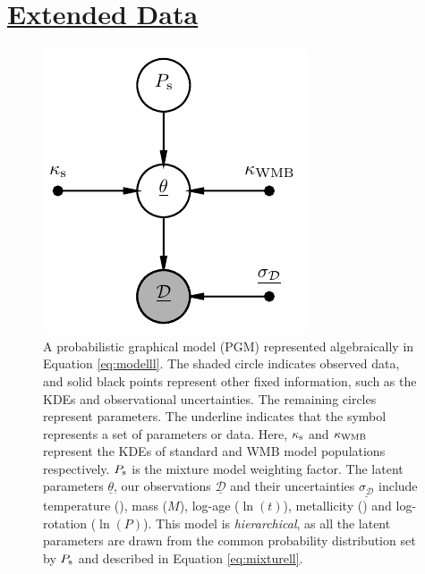 \clearpage 
\section*{\underline{Extended Data}}

\setcounter{figure}{0}    

\begin{figure}[h!]
	\centering
	\includegraphics[width=0.6 \textwidth]{pgm_models.pdf}
	\caption{A probabilistic graphical model (PGM) represented algebraically in Equation \ref{eq:modelll}. The shaded circle indicates observed data, and solid black points represent other fixed information, such as the KDEs and observational uncertainties. The remaining circles represent parameters. The underline indicates that the symbol represents a set of parameters or data. Here, $\kappa_{\rm{s}}$ and $\kappa_{\rm WMB}$ represent the KDEs of standard and WMB model populations respectively. $P_{\rm{s}}$ is the mixture model weighting factor. The latent parameters $\underline{\theta}$, our observations $\underline{\mathcal{D}}$ and their uncertainties $\underline{\sigma_{\mathcal{D}}}$ include temperature (\teff), mass ($M$), log-age ($\ln(t)$), metallicity (\feh) and log-rotation ($\ln(P)$). This model is \textit{hierarchical}, as all the latent parameters are drawn from the common probability distribution set by $P_{\rm{s}}$ and described in Equation \ref{eq:mixturell}.}
	\label{fig:pgm}
\end{figure}

